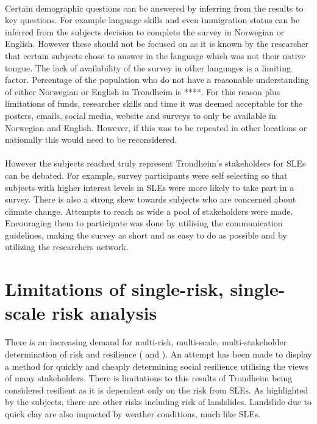 \paragraph{}
Certain demographic questions can be answered by inferring from the results to key questions. For example language skills and even immigration status can be inferred from the subjects decision to complete the survey in Norwegian or English. However these should not be focused on as it is known by the researcher that certain subjects chose to answer in the language which was not their native tongue. The lack of availability of the survey in other languages is a limiting factor. Percentage of the population who do not have a reasonable understanding of either Norwegian or English in Trondheim is ****. For this reason plus limitations of funds, researcher skills and time it was deemed acceptable for the posters, emails, social media, website and surveys to only be available in Norwegian and English. However, if this was to be repeated in other locations or nationally this would need to be reconsidered. 
\paragraph{}
 However the subjects reached truly represent Trondheim's stakeholders for SLEs can be debated. For example, survey participants were self selecting so that subjects with higher interest levels in SLEs were more likely to take part in a survey. There is also a strong skew towards subjects who are concerned about climate change. Attempts to reach as wide a pool of stakeholders were made. Encouraging them to participate was done by utilising the communication guidelines, making the survey as short and as easy to do as possible and by utilizing the researchers network. 



\section{Limitations of single-risk, single-scale risk analysis}
There is an increasing demand for multi-risk, multi-scale, multi-stakeholder determination of risk and resilience (\cite{gerkensmeier_governing_2018} and \cite{cutter_community_2020}). An attempt has been made to display a method for quickly and cheaply determining social resilience utilising the views of many stakeholders. There is limitations to this results of Trondheim being considered resilient as it is dependent only on the risk from SLEs. As highlighted by the subjects, there are other risks including risk of landslides. Landslide due to quick clay are also impacted by weather conditions, much like SLEs. 
